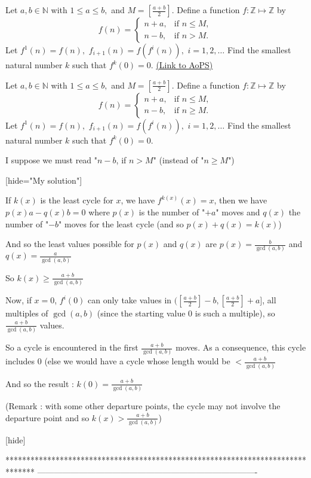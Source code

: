 \begin{problem}
	Let $ a, b \in \mathbb{N}$  with $ 1 \leq a \leq b,$ and $ M = \left[\frac {a + b}{2} \right].$ Define a function $ f: \mathbb{Z} \mapsto \mathbb{Z}$ by
\[ f(n) = \begin{cases} n + a, & \text{if } n \leq M, \\
n - b, & \text{if } n >M. \end{cases}
\]
Let $ f^1(n) = f(n),$ $ f_{i + 1}(n) = f(f^i(n)),$ $ i = 1, 2, \ldots$ Find the smallest natural number $ k$ such that $ f^k(0) = 0.$
	\flushright \href{https://artofproblemsolving.com/community/c6h220954}{(Link to AoPS)}
\end{problem}



\begin{solution}
	\begin{tcolorbox}Let $ a, b \in \mathbb{N}$  with $ 1 \leq a \leq b,$ and $ M = \left[\frac {a + b}{2} \right].$ Define a function $ f: \mathbb{Z} \mapsto \mathbb{Z}$ by
\[ f(n) = \begin{cases} n + a, & \text{if } n \leq M, \\
n - b, & \text{if } n \geq M. \end{cases}
\]
Let $ f^1(n) = f(n),$ $ f_{i + 1}(n) = f(f^i(n)),$ $ i = 1, 2, \ldots$ Find the smallest natural number $ k$ such that $ f^k(0) = 0.$\end{tcolorbox}

I suppose we must read "$ n - b$, if $ n > M$" (instead of "$ n\geq M$")

[hide="My solution"]

If $ k(x)$ is the least cycle for $ x$, we have $ f^{k(x)}(x) = x$, then we have $ p(x)a - q(x)b = 0$ where $ p(x)$ is the number of "$ + a$" moves and $ q(x)$ the number of "$ - b$" moves for the least cycle (and so $ p(x) + q(x) = k(x)$)

And so the least values possible for $ p(x)$ and $ q(x)$ are $ p(x) = \frac {b}{\gcd(a,b)}$ and $ q(x) = \frac {a}{\gcd(a,b)}$

So $ k(x)\geq \frac {a + b}{\gcd(a,b)}$

Now, if $ x = 0$, $ f^i(0)$ can only take values in $ ([\frac {a + b}{2}] - b,[\frac {a + b}{2}] + a]$, all multiples of $ \gcd(a,b)$ (since the starting value $ 0$ is such a multiple), so $ \frac {a + b}{\gcd(a,b)}$ values.

So a cycle is encountered in the first $ \frac {a + b}{\gcd(a,b)}$ moves. As a consequence, this cycle includes $ 0$ (else we would have a cycle whose length would be $ < \frac {a + b}{\gcd(a,b)}$

And so the result : $ k(0) = \frac {a + b}{\gcd(a,b)}$

(Remark : with some other departure points, the cycle may not involve the departure point and so $ k(x) > \frac {a + b}{\gcd(a,b)}$)

[\/hide]
\end{solution}
*******************************************************************************
-------------------------------------------------------------------------------

